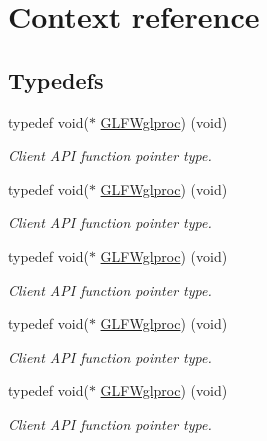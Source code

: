 \hypertarget{group__context}{}\section{Context reference}
\label{group__context}
\subsection*{Typedefs}
\begin{DoxyCompactItemize}
\item 
typedef void($\ast$ \hyperlink{group__context_ga3d47c2d2fbe0be9c505d0e04e91a133c}{G\+L\+F\+Wglproc}) (void)
\begin{DoxyCompactList}\small\item\em Client A\+PI function pointer type. \end{DoxyCompactList}\item 
typedef void($\ast$ \hyperlink{group__context_ga3d47c2d2fbe0be9c505d0e04e91a133c}{G\+L\+F\+Wglproc}) (void)
\begin{DoxyCompactList}\small\item\em Client A\+PI function pointer type. \end{DoxyCompactList}\item 
typedef void($\ast$ \hyperlink{group__context_ga3d47c2d2fbe0be9c505d0e04e91a133c}{G\+L\+F\+Wglproc}) (void)
\begin{DoxyCompactList}\small\item\em Client A\+PI function pointer type. \end{DoxyCompactList}\item 
typedef void($\ast$ \hyperlink{group__context_ga3d47c2d2fbe0be9c505d0e04e91a133c}{G\+L\+F\+Wglproc}) (void)
\begin{DoxyCompactList}\small\item\em Client A\+PI function pointer type. \end{DoxyCompactList}\item 
typedef void($\ast$ \hyperlink{group__context_ga3d47c2d2fbe0be9c505d0e04e91a133c}{G\+L\+F\+Wglproc}) (void)
\begin{DoxyCompactList}\small\item\em Client A\+PI function pointer type. \end{DoxyCompactList}\end{DoxyCompactItemize}
